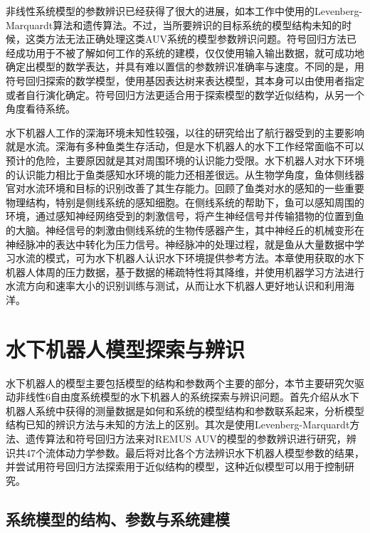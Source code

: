 非线性系统模型的参数辨识已经获得了很大的进展，如本工作中使用的Levenberg-Marquardt算法和遗传算法\cite{baruch2009levenberg,zhou2013genetic}。不过，当所要辨识的目标系统的模型结构未知的时候，这类方法无法正确处理这类AUV系统的模型参数辨识问题。符号回归方法已经成功用于不被了解如何工作的系统的建模，仅仅使用输入输出数据，就可成功地确定出模型的数学表达，并具有难以置信的参数辨识准确率与速度\cite{menezes2014symbolic,Moreno2015Symbolic,wu2016parametric}。不同的是，用符号回归探索的数学模型，使用基因表达树来表达模型，其本身可以由使用者指定或者自行演化确定。符号回归方法更适合用于探索模型的数学近似结构，从另一个角度看待系统。

水下机器人工作的深海环境未知性较强，以往的研究给出了航行器受到的主要影响就是水流。深海有多种鱼类生存活动，但是水下机器人的水下工作经常面临不可以预计的危险，主要原因就是其对周围环境的认识能力受限。水下机器人对水下环境的认识能力相比于鱼类感知水环境的能力还相差很远\cite{verschure2003environmentally}。从生物学角度，鱼体侧线器官对水流环境和目标的识别改善了其生存能力。回顾了鱼类对水的感知的一些重要物理结构，特别是侧线系统的感知细胞。在侧线系统的帮助下，鱼可以感知周围的环境，通过感知神经网络受到的刺激信号，将产生神经信号并传输猎物的位置到鱼的大脑\cite{abdulsadda2012artificial,Wu2016lateralline}。神经信号的刺激由侧线系统的生物传感器产生，其中神经丘的机械变形在神经脉冲的表达中转化为压力信号。神经脉冲的处理过程，就是鱼从大量数据中学习水流的模式，可为水下机器人认识水下环境提供参考方法\cite{huang2015trends,martis2013ecg,chen2000new,liu2012support,tagliaferri2015wind}。本章使用获取的水下机器人体周的压力数据，基于数据的稀疏特性将其降维，并使用机器学习方法进行水流方向和速率大小的识别训练与测试，从而让水下机器人更好地认识和利用海洋。

\section{水下机器人模型探索与辨识 }

水下机器人的模型主要包括模型的结构和参数两个主要的部分，本节主要研究欠驱动非线性6自由度系统模型的水下机器人的系统探索与辨识问题。首先介绍从水下机器人系统中获得的测量数据是如何和系统的模型结构和参数联系起来，分析模型结构已知的辨识方法与未知的方法上的区别。其次是使用Levenberg-Marquardt方法、遗传算法和符号回归方法来对REMUS AUV的模型的参数辨识进行研究，辨识共47个流体动力学参数。最后将对比各个方法辨识水下机器人模型参数的结果，并尝试用符号回归方法探索用于近似结构的模型，这种近似模型可以用于控制研究。

\subsection{系统模型的结构、参数与系统建模}

